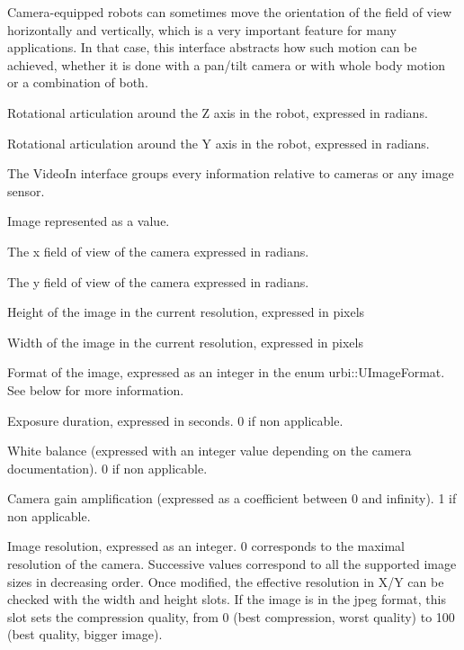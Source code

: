Camera-equipped robots can sometimes move the orientation of the field
of view horizontally and vertically, which is a very important feature
for many applications. In that case, this interface abstracts how such
motion can be achieved, whether it is done with a pan/tilt camera or
with whole body motion or a combination of both.

\begin{slots}
  {%
    Rotational articulation around the Z axis in the robot, expressed
    in radians.%
  }

  {%
    Rotational articulation around the Y axis in the robot, expressed
    in radians.%
  }

\end{slots}


The VideoIn interface groups every information relative to cameras or any
image sensor.

\begin{slots}
  {%
    Image represented as a  value. %
  }

  {%
    The x field of view of the camera expressed in radians.%
  }

  {%
    The y field of view of the camera expressed in radians.%
  }

  {%
    Height of the image in the current resolution, expressed in
    pixels%
  }

  {%
    Width of the image in the current resolution, expressed in pixels%
  }

  {%
    Format of the image, expressed as an integer in the enum urbi::UImageFormat.
    See below for more information.%
  }

  {%
    Exposure duration, expressed in seconds. 0 if non applicable.%
  }

  {%
    White balance (expressed with an integer value depending on the
    camera documentation). 0 if non applicable.%
  }

  {%
    Camera gain amplification (expressed as a coefficient between 0
    and infinity). 1 if non applicable.%
  }

  {%
    Image resolution, expressed as an integer. 0 corresponds to the
    maximal resolution of the camera. Successive values correspond to
    all the supported image sizes in decreasing order.
    Once modified, the effective resolution in X/Y can be checked with
    the width and height slots.%
  }
  {%
    If the image is in the jpeg format, this slot sets the compression quality,
    from 0 (best compression, worst quality) to 100 (best quality, bigger
    image).%
  }

\end{slots}

